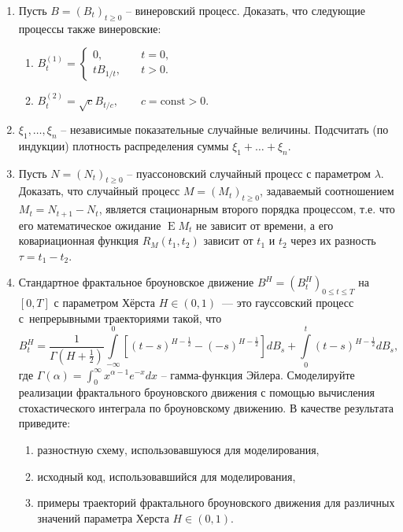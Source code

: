 \documentclass[a4paper,14pt]{extreport}
\renewcommand{\=}[1]{\stackrel{#1}{=}} %
\newcommand{\Expect}{\mathop{{}\mathrm{E}}}
\newcommand{\generaltime}{t \geqslant 0}
\newcommand{\finiteconttime}[1]{0 \leqslant t \leqslant #1}
\newcommand{\newprocess}[1]{
	\ensuremath{
		#1 = \left(#1 _t\right)_{\generaltime}
	}
}
\newcommand{\newprocessfc}[2]{
	\ensuremath{
		#1 = \left(#1 _t\right)_{\finiteconttime{#2}}
	}
}
\newcommand{\fbm}{B^H}
\begin{document}
\begin{enumerate}
\item Пусть $\newprocess{B}$ -- винеровский процесс. Доказать,
что следующие процессы также винеровские:
\begin{enumerate}
	\item $B_t^{(1)} = 
	\begin{cases}
		0, \quad & t = 0, \\
		t B_{1/t}, \quad & t > 0.
	\end{cases}$
	\item $B_t^{(2)} = 
	\sqrt{c} B_{t/c}, \qquad c = \mathrm{const} > 0$.
\end{enumerate}

\item $\xi_1, \ldots, \xi_n$ -- независимые показательные случайные величины.
Подсчитать (по индукции) плотность распределения суммы
$\xi_1 + \ldots + \xi_n$.

\item Пусть $\newprocess{N}$ -- пуассоновский случайный
процесс с параметром $\lambda$. Доказать, что случайный
процесс $\newprocess{M}$, задаваемый соотношением
$M_t = N_{t+1} - N_t$, является стационарным второго порядка
процессом, т.е. что его математическое ожидание $\Expect M_t$
не зависит от времени, а его ковариационная функция
$R_M(t_1, t_2)$ зависит от $t_1$ и $t_2$ через их разность
$\tau = t_1 - t_2$.

\item Стандартное фрактальное броуновское движение $\newprocessfc{\fbm}{T}$
на $[0,T]$ с параметром Хёрста $H \in (0,1)$~---
это гауссовский процесс с~непрерывными траекториями такой, что
\[
\fbm_t = \frac{1}{\Gamma(H + \frac 1 2)}
	\int\limits_{-\infty}^{0} [(t - s)^{H - \frac 1 2 } - (-s)^{H-\frac 1 2}] dB_s
	+ \int\limits_{0}^{t} (t - s)^{H - \frac 1 2 } dB_s,
\]
где 
$\Gamma(\alpha) = \int_0^{\infty} x^{\alpha - 1} e^{-x} dx$ -- гамма-функция Эйлера.
Смоделируйте реализации фрактального броуновского
движения с помощью вычисления стохастического интеграла
по броуновскому движению. В качестве результата
приведите:
\begin{enumerate}
	\item разностную схему, использовавшуюся для моделирования,
	\item исходный код, использовавшийся для моделирования,
	\item примеры траекторий фрактального броуновского движения
	для различных значений параметра Херста $H \in (0, 1)$.
\end{enumerate}


\end{enumerate}
\end{document}

